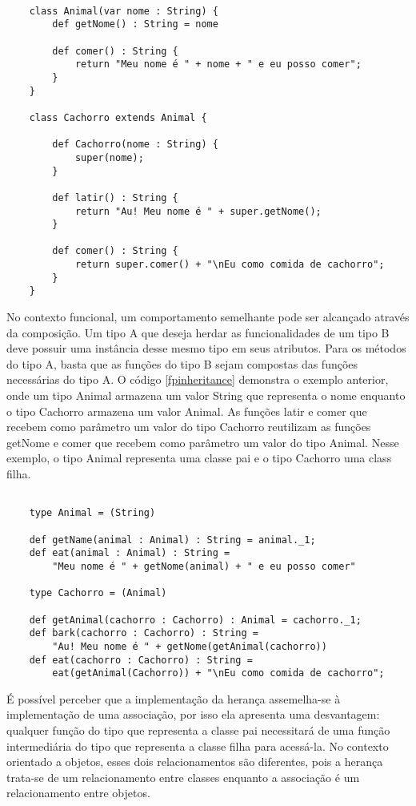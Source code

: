 \begin{lstlisting}[caption={Herança em Orientação a Objetos},label=ooinheritance]
    
    class Animal(var nome : String) {
        def getNome() : String = nome
        
        def comer() : String {
            return "Meu nome é " + nome + " e eu posso comer";
        }
    }

    class Cachorro extends Animal {
        
        def Cachorro(nome : String) {
            super(nome);
        }

        def latir() : String {
            return "Au! Meu nome é " + super.getNome();
        }

        def comer() : String {
            return super.comer() + "\nEu como comida de cachorro";
        }
    }

\end{lstlisting}

No contexto funcional, um comportamento semelhante 
pode ser alcançado através da composição. Um tipo A 
que deseja herdar as funcionalidades de um tipo B 
deve possuir uma instância desse mesmo tipo em seus 
atributos. Para os métodos do tipo A, basta que as 
funções do tipo B sejam compostas das funções 
necessárias do tipo A. O código \ref{fpinheritance} 
demonstra o exemplo anterior, onde um tipo Animal 
armazena um valor String que representa o nome 
enquanto o tipo Cachorro armazena um valor Animal. 
As funções latir e comer que recebem como parâmetro 
um valor do tipo Cachorro reutilizam as funções getNome 
e comer que recebem como parâmetro um valor do tipo 
Animal. Nesse exemplo, o tipo Animal representa 
uma classe pai e o tipo Cachorro uma class filha.

\begin{lstlisting}[caption={Herança em Programação Funcional},label=fpinheritance]
    
    type Animal = (String)

    def getName(animal : Animal) : String = animal._1;
    def eat(animal : Animal) : String = 
        "Meu nome é " + getNome(animal) + " e eu posso comer"

    type Cachorro = (Animal)

    def getAnimal(cachorro : Cachorro) : Animal = cachorro._1;
    def bark(cachorro : Cachorro) : String = 
        "Au! Meu nome é " + getNome(getAnimal(cachorro))
    def eat(cachorro : Cachorro) : String = 
        eat(getAnimal(Cachorro)) + "\nEu como comida de cachorro";

\end{lstlisting}

É possível perceber que a implementação da herança 
assemelha-se à implementação de uma associação, 
por isso ela apresenta uma desvantagem: 
qualquer função do tipo que representa 
a classe pai necessitará de uma função 
intermediária do tipo que representa a classe 
filha para acessá-la. 
No contexto orientado a objetos, esses dois 
relacionamentos são diferentes, pois a 
herança trata-se de um relacionamento entre 
classes enquanto a associação é um relacionamento 
entre objetos\cite{umlsystems}. 
